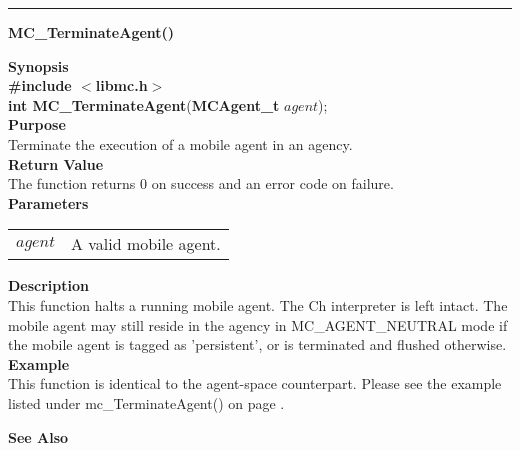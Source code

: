 \noindent
\vspace{5pt}
\rule{6.5in}{0.015in}
\noindent
{\LARGE \bf MC\_TerminateAgent()}\\
{}

\noindent
{\bf Synopsis}\\
{\bf \#include $<$libmc.h$>$}\\
{\bf int MC\_TerminateAgent}({\bf MCAgent\_t} $agent$);\\

\noindent
{\bf Purpose}\\
Terminate the execution of a mobile agent in an agency.\\

\noindent
{\bf Return Value}\\
The function returns 0 on success and an error code on failure.\\

\noindent
{\bf Parameters}
\vspace{-0.1in}
\begin{description}
\item               
\begin{tabular}{p{10 mm}p{145 mm}}
$agent$ & A valid mobile agent. 
\end{tabular}
\end{description}

\noindent
{\bf Description}\\
This function halts a running mobile agent. 
The Ch interpreter is left intact. 
The mobile agent may still reside in the agency in MC\_AGENT\_NEUTRAL mode if 
the mobile agent is tagged as 'persistent', or is terminated and flushed 
otherwise.\\

\noindent
{\bf Example}\\
This function is identical to the agent-space counterpart. Please see the example
listed under mc\_TerminateAgent() on page \pageref{api:mc_TerminateAgent()}.\\
\noindent

\noindent
{\bf See Also}\\

